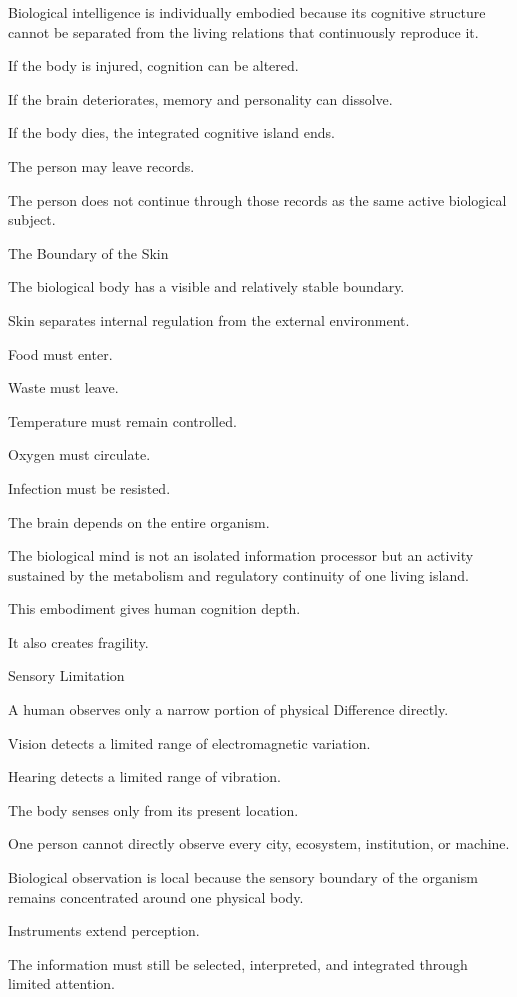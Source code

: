 Biological intelligence is individually embodied because its cognitive structure cannot be separated from the living relations that continuously reproduce it.

If the body is injured, cognition can be altered.

If the brain deteriorates, memory and personality can dissolve.

If the body dies, the integrated cognitive island ends.

The person may leave records.

The person does not continue through those records as the same active biological subject.

The Boundary of the Skin

The biological body has a visible and relatively stable boundary.

Skin separates internal regulation from the external environment.

Food must enter.

Waste must leave.

Temperature must remain controlled.

Oxygen must circulate.

Infection must be resisted.

The brain depends on the entire organism.

The biological mind is not an isolated information processor but an activity sustained by the metabolism and regulatory continuity of one living island.

This embodiment gives human cognition depth.

It also creates fragility.

Sensory Limitation

A human observes only a narrow portion of physical Difference directly.

Vision detects a limited range of electromagnetic variation.

Hearing detects a limited range of vibration.

The body senses only from its present location.

One person cannot directly observe every city, ecosystem, institution, or machine.

Biological observation is local because the sensory boundary of the organism remains concentrated around one physical body.

Instruments extend perception.

The information must still be selected, interpreted, and integrated through limited attention.

